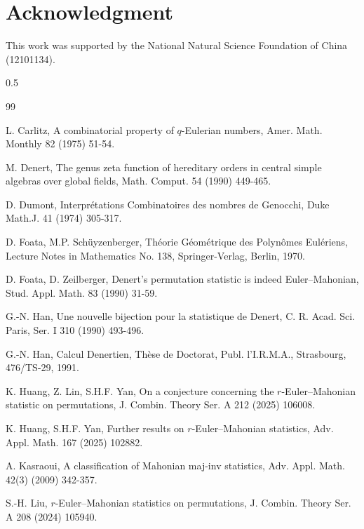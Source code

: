 \documentclass[12pt]{article}
\begin{document}
\section*{Acknowledgment}
This work was supported by the National Natural Science Foundation of China (12101134).

\begin{spacing}{0.5}
	\begin{thebibliography}{99}\setlength{\itemsep}{1.5mm}
		\small{
			 L. Carlitz,
			A combinatorial property of $q$-Eulerian numbers,
			Amer. Math. Monthly 82 (1975) 51-54.
			
			  M. Denert, 
			The genus zeta function of hereditary orders in central simple algebras over global fields,
			Math. Comput. 54 (1990) 449-465.
			
			 D. Dumont,
			Interpr\'{e}tations Combinatoires des nombres de Genocchi, 
			Duke Math.J. 41 (1974) 305-317.
			
			 D. Foata, M.P. Sch\"{u}yzenberger,
			Th\'{e}orie G\'{e}om\'{e}trique des Polyn\^{o}mes Eul\'{e}riens,
			Lecture Notes in Mathematics No. 138, Springer-Verlag, Berlin, 1970.
			
			 D. Foata, D. Zeilberger,
			Denert's permutation statistic is indeed Euler--Mahonian,
			Stud. Appl. Math. 83 (1990) 31-59.
			
			G.-N. Han,
			Une nouvelle bijection pour la statistique de Denert, 
			C. R. Acad. Sci. Paris, Ser. I 310 (1990) 493-496.
			
			G.-N. Han,
			Calcul Denertien, 
			Th\`{e}se de Doctorat, Publ. l'I.R.M.A., Strasbourg, 476/TS-29, 1991. 
			
			K. Huang, Z. Lin, S.H.F. Yan,
			On a conjecture concerning the $r$-Euler--Mahonian statistic on permutations,
			J. Combin. Theory Ser. A 212 (2025) 106008.
			
			K. Huang, S.H.F. Yan,
            Further results on $r$-Euler--Mahonian statistics,
            Adv. Appl. Math. 167 (2025) 102882.	
			
			 A. Kasraoui,
			A classification of Mahonian maj-inv statistics,
			Adv. Appl. Math.  42(3) (2009) 342-357.
			
			 S.-H. Liu,
			$r$-Euler--Mahonian statistics on permutations,
			J. Combin. Theory Ser. A 208 (2024) 105940.
			
}
\end{thebibliography}
\end{spacing}
\end{document}
